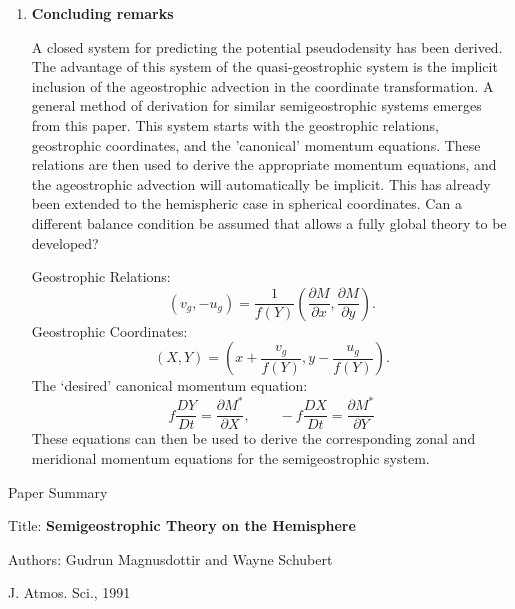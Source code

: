 \documentclass[11pt]{report}
\begin{document}
\begin{enumerate}
\item{\textbf{Concluding remarks}} 

A closed system for predicting the potential pseudodensity has been derived.  The advantage of this
system of the quasi-geostrophic system is the implicit inclusion of the ageostrophic advection in
the coordinate transformation.  A general method of derivation for similar semigeostrophic systems
emerges from this paper.  This system starts with the geostrophic relations, geostrophic
coordinates, and the 'canonical' momentum equations.  These relations are then used to derive the
appropriate momentum equations, and the ageostrophic advection will automatically be implicit.  This
has already been extended to the hemispheric case in spherical coordinates.  Can a different balance
condition be assumed that allows a fully global theory to be developed?  

Geostrophic Relations: 
\begin{equation}
    \left(v_g,-u_g\right)=\frac{1}{f(Y)}\left(\frac{\partial M}{\partial x},
    \frac{\partial M}{\partial y}\right).
\end{equation}
Geostrophic Coordinates: 
\begin{equation}
    \left(X,Y\right)=\left(x+\frac{v_g}{f(Y)},y-\frac{u_g}{f(Y)}\right).
\end{equation}
The `desired' canonical momentum equation: 
\begin{equation}
    f\frac{DY}{Dt}=\frac{\partial M^*}{\partial X}, \qquad 
    -f\frac{DX}{Dt}=\frac{\partial M^*}{\partial Y}
\end{equation}
These equations can then be used to derive the corresponding zonal and meridional momentum equations
for the semigeostrophic system.  
\end{enumerate}

Paper Summary

Title: \textbf{Semigeostrophic Theory on the Hemisphere}

Authors: Gudrun Magnusdottir and Wayne Schubert

J. Atmos. Sci., 1991

\vspace{0.25in}
\end{document}
